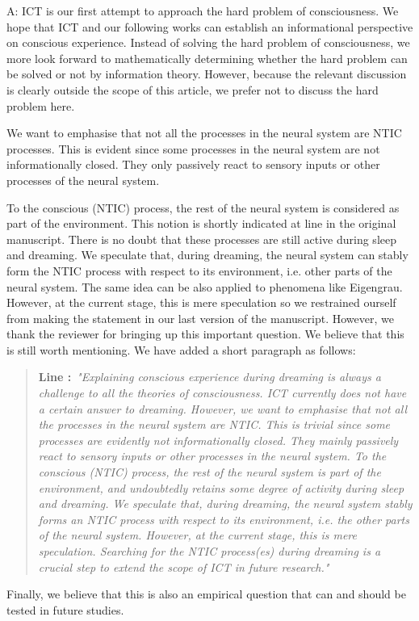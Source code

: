 \documentclass[utf8]{article}
\newenvironment{ans}  
    {\color{Black}\noindent A:}
    {~\newline}
\newcommand{\addnew}[2]{\blockcquote{}{\textbf{Line #1:}~\newline\textit{"#2"}}
}
\begin{document}
    	\begin{ans}
    		ICT is our first attempt to approach the hard problem of consciousness. We hope that ICT and our following works can establish an informational perspective on conscious experience. Instead of solving the hard problem of consciousness, we more look forward to mathematically determining whether the hard problem can be solved or not by information theory. However, because the relevant discussion is clearly outside the scope of this article, we prefer not to discuss the hard problem here.
    		
			We want to emphasise that not all the processes in the neural system are NTIC processes. This is evident since some processes in the neural system are not informationally closed. They only passively react to sensory inputs or other processes of the neural system. 

    		To the conscious (NTIC) process, the rest of the neural system is considered as part of the environment. This notion is shortly indicated at line  in the original manuscript. There is no doubt that these processes are still active during sleep and dreaming. We speculate that, during dreaming, the neural system can stably form the NTIC process with respect to its environment, i.e. other parts of the neural system. The same idea can be also applied to phenomena like Eigengrau. However, at the current stage, this is mere speculation so we restrained ourself from making the statement in our last version of the manuscript. However, we thank the reviewer for bringing up this important question. We believe that this is still worth mentioning. We have added a short paragraph as follows:
    		
    		\addnew{}{Explaining conscious experience during dreaming is always a challenge to all the theories of consciousness. ICT currently does not have a certain answer to dreaming. However, we want to emphasise that not all the processes in the neural system are NTIC. This is trivial since some processes are evidently not informationally closed. They mainly passively react to sensory inputs or other processes in the neural system. To the conscious (NTIC) process, the rest of the neural system is part of the environment, and undoubtedly retains some degree of activity during sleep and dreaming. We speculate that, during dreaming, the neural system stably forms an NTIC process with respect to its environment, i.e. the other parts of the neural system. However, at the current stage, this is mere speculation. Searching for the NTIC process(es) during dreaming is a crucial step to extend the scope of ICT in future research.}
    		    
    		Finally, we believe that this is also an
    		empirical question that can and should be tested in future studies. 
    	\end{ans}

	
\end{document}
